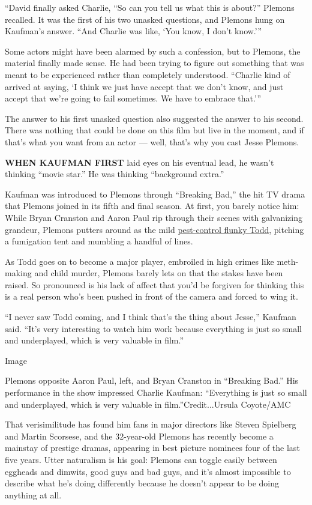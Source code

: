 ``David finally asked Charlie, ``So can you tell us what this is
about?'' Plemons recalled. It was the first of his two unasked
questions, and Plemons hung on Kaufman's answer. ``And Charlie was like,
`You know, I don't know.'''

Some actors might have been alarmed by such a confession, but to
Plemons, the material finally made sense. He had been trying to figure
out something that was meant to be experienced rather than completely
understood. ``Charlie kind of arrived at saying, `I think we just have
accept that we don't know, and just accept that we're going to fail
sometimes. We have to embrace that.'''

The answer to his first unasked question also suggested the answer to
his second. There was nothing that could be done on this film but live
in the moment, and if that's what you want from an actor --- well,
that's why you cast Jesse Plemons.

\textbf{WHEN KAUFMAN FIRST} laid eyes on his eventual lead, he wasn't
thinking ``movie star.'' He was thinking ``background extra.''

Kaufman was introduced to Plemons through ``Breaking Bad,'' the hit TV
drama that Plemons joined in its fifth and final season. At first, you
barely notice him: While Bryan Cranston and Aaron Paul rip through their
scenes with galvanizing grandeur, Plemons putters around as the mild
\href{https://breakingbad.fandom.com/wiki/Todd_Alquist}{pest-control
flunky Todd}, pitching a fumigation tent and mumbling a handful of
lines.

As Todd goes on to become a major player, embroiled in high crimes like
meth-making and child murder, Plemons barely lets on that the stakes
have been raised. So pronounced is his lack of affect that you'd be
forgiven for thinking this is a real person who's been pushed in front
of the camera and forced to wing it.

``I never saw Todd coming, and I think that's the thing about Jesse,''
Kaufman said. ``It's very interesting to watch him work because
everything is just so small and underplayed, which is very valuable in
film.''

Image

Plemons opposite Aaron Paul, left, and Bryan Cranston in ``Breaking
Bad.'' His performance in the show impressed Charlie Kaufman:
``Everything is just so small and underplayed, which is very valuable in
film.''Credit...Ursula Coyote/AMC

That verisimilitude has found him fans in major directors like Steven
Spielberg and Martin Scorsese, and the 32-year-old Plemons has recently
become a mainstay of prestige dramas, appearing in best picture nominees
four of the last five years. Utter naturalism is his goal: Plemons can
toggle easily between eggheads and dimwits, good guys and bad guys, and
it's almost impossible to describe what he's doing differently because
he doesn't appear to be doing anything at all.


